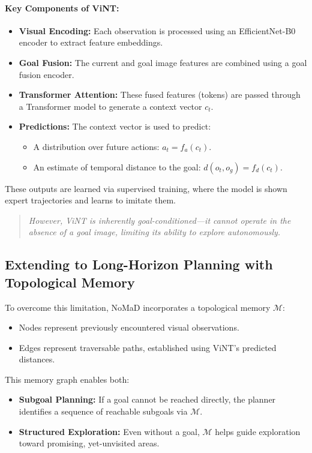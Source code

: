 \documentclass[12pt]{article}
\begin{document}
\begin{appendices}
\paragraph{Key Components of ViNT:} 
\begin{itemize} 
    \item \textbf{Visual Encoding:} Each observation is processed using an EfficientNet-B0 encoder to extract feature embeddings. 
    \item \textbf{Goal Fusion:} The current and goal image features are combined using a goal fusion encoder. 
    \item \textbf{Transformer Attention:} These fused features (tokens) are passed through a Transformer model to generate a context vector $c_t$. 
    \item \textbf{Predictions:} The context vector is used to predict: 
    \begin{itemize} 
        \item A distribution over future actions: $a_t = f_a(c_t)$. 
        \item An estimate of temporal distance to the goal: $d(o_t, o_g) = f_d(c_t)$. 
    \end{itemize} 
\end{itemize}
These outputs are learned via supervised training, where the model is shown expert trajectories and learns to imitate them.
\begin{quote}
    \textit{However, ViNT is inherently goal-conditioned—it cannot operate in the absence of a goal image, limiting its ability to explore autonomously.} 
\end{quote}
\subsection*{Extending to Long-Horizon Planning with Topological Memory}
To overcome this limitation, NoMaD incorporates a topological memory $\mathcal{M}$: 
\begin{itemize} 
    \item Nodes represent previously encountered visual observations. 
    \item Edges represent traversable paths, established using ViNT's predicted distances. 
\end{itemize}
This memory graph enables both: 
\begin{itemize} 
    \item \textbf{Subgoal Planning:} If a goal cannot be reached directly, the planner identifies a sequence of reachable subgoals via $\mathcal{M}$. 
    \item \textbf{Structured Exploration:} Even without a goal, $\mathcal{M}$ helps guide exploration toward promising, yet-unvisited areas. 
\end{itemize}

\end{appendices}
\end{document}
